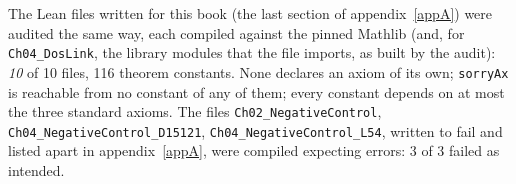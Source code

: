 The Lean files written for this book (the last section of appendix~\ref{appA}) were audited the same way, each compiled against the pinned Mathlib (and, for \texttt{Ch04\_DosLink}, the library modules that the file imports, as built by the audit): \emph{10} of 10 files, 116 theorem constants. None declares an axiom of its own; \texttt{sorryAx} is reachable from no constant of any of them; every constant depends on at most the three standard axioms. The files \texttt{Ch02\_NegativeControl}, \texttt{Ch04\_NegativeControl\_D15121}, \texttt{Ch04\_NegativeControl\_L54}, written to fail and listed apart in appendix~\ref{appA}, were compiled expecting errors: 3 of 3 failed as intended. 
